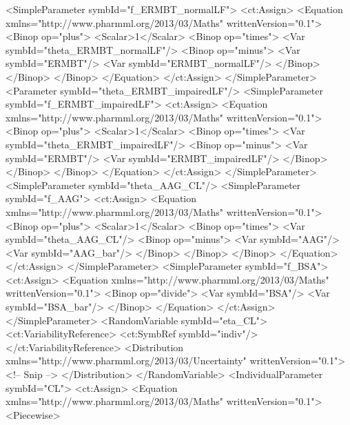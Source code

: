 \documentclass[a4paper,10pt]{article}
\begin{document}
\begin{xmlcode}
<SimpleParameter symbId="f_ERMBT_normalLF">
    <ct:Assign>
        <Equation xmlns="http://www.pharmml.org/2013/03/Maths" writtenVersion="0.1">
            <Binop op="plus">
                <Scalar>1</Scalar>
                <Binop op="times">
                    <Var symbId="theta_ERMBT_normalLF"/>
                    <Binop op="minus">
                        <Var symbId="ERMBT"/>
                        <Var symbId="ERMBT_normalLF"/>
                    </Binop>
                </Binop>
            </Binop>
        </Equation>
    </ct:Assign>
</SimpleParameter>
<Parameter symbId="theta_ERMBT_impairedLF"/>
<SimpleParameter symbId="f_ERMBT_impairedLF">
    <ct:Assign>
        <Equation xmlns="http://www.pharmml.org/2013/03/Maths" writtenVersion="0.1">
            <Binop op="plus">
                <Scalar>1</Scalar>
                <Binop op="times">
                    <Var symbId="theta_ERMBT_impairedLF"/>
                    <Binop op="minus">
                        <Var symbId="ERMBT"/>
                        <Var symbId="ERMBT_impairedLF"/>
                    </Binop>
                </Binop>
            </Binop>
        </Equation>
    </ct:Assign>
</SimpleParameter>
<SimpleParameter symbId="theta_AAG_CL"/>
<SimpleParameter symbId="f_AAG">
    <ct:Assign>
        <Equation xmlns="http://www.pharmml.org/2013/03/Maths" writtenVersion="0.1">
            <Binop op="plus">
                <Scalar>1</Scalar>
                <Binop op="times">
                    <Var symbId="theta_AAG_CL"/>
                    <Binop op="minus">
                        <Var symbId="AAG"/>
                        <Var symbId="AAG_bar"/>
                    </Binop>
                </Binop>
            </Binop>
        </Equation>
    </ct:Assign>
</SimpleParameter>
<SimpleParameter symbId="f_BSA">
    <ct:Assign>
        <Equation xmlns="http://www.pharmml.org/2013/03/Maths" writtenVersion="0.1">
            <Binop op="divide">
                <Var symbId="BSA"/>
                <Var symbId="BSA_bar"/>
            </Binop>
        </Equation>
    </ct:Assign>
</SimpleParameter>
<RandomVariable symbId="eta_CL">
    <ct:VariabilityReference>
        <ct:SymbRef symbId="indiv"/>
    </ct:VariabilityReference>
    <Distribution xmlns="http://www.pharmml.org/2013/03/Uncertainty"
    writtenVersion="0.1">
         <!-- Snip -->
    </Distribution>
</RandomVariable>
<IndividualParameter symbId="CL">
    <ct:Assign>
        <Equation xmlns="http://www.pharmml.org/2013/03/Maths" writtenVersion="0.1">
            <Piecewise>

\end{xmlcode}
\end{document}
